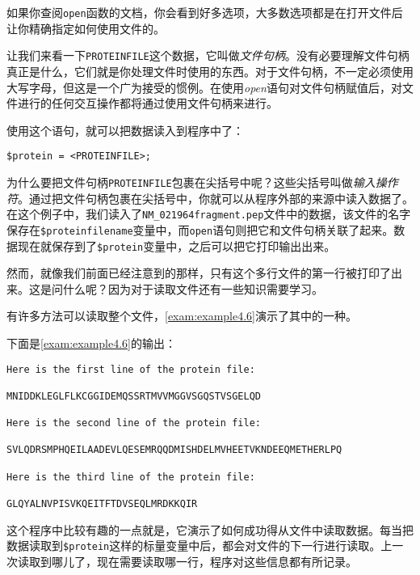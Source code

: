如果你查阅\verb|open|函数的文档，你会看到好多选项，大多数选项都是在打开文件后让你精确指定如何使用文件的。

让我们来看一下\verb|PROTEINFILE|这个数据，它叫做\textit{文件句柄}。没有必要理解文件句柄真正是什么，它们就是你处理文件时使用的东西。对于文件句柄，不一定必须使用大写字母，但这是一个广为接受的惯例。在使用\textit{open}语句对文件句柄赋值后，对文件进行的任何交互操作都将通过使用文件句柄来进行。

使用这个语句，就可以把数据读入到程序中了：

\begin{lstlisting}
$protein = <PROTEINFILE>;
\end{lstlisting}

为什么要把文件句柄\verb|PROTEINFILE|包裹在尖括号中呢？这些尖括号叫做\textit{输入操作符}。通过把文件句柄包裹在尖括号中，你就可以从程序外部的来源中读入数据了。在这个例子中，我们读入了\verb|NM_021964fragment.pep|文件中的数据，该文件的名字保存在\verb|$proteinfilename|变量中，而\verb|open|语句则把它和文件句柄关联了起来。数据现在就保存到了\verb|$protein|变量中，之后可以把它打印输出出来。

然而，就像我们前面已经注意到的那样，只有这个多行文件的第一行被打印了出来。这是问什么呢？因为对于读取文件还有一些知识需要学习。

有许多方法可以读取整个文件，\autoref{exam:example4.6}演示了其中的一种。



下面是\autoref{exam:example4.6}的输出：

\begin{lstlisting}
Here is the first line of the protein file:

MNIDDKLEGLFLKCGGIDEMQSSRTMVVMGGVSGQSTVSGELQD

Here is the second line of the protein file:

SVLQDRSMPHQEILAADEVLQESEMRQQDMISHDELMVHEETVKNDEEQMETHERLPQ

Here is the third line of the protein file:

GLQYALNVPISVKQEITFTDVSEQLMRDKKQIR
\end{lstlisting}

这个程序中比较有趣的一点就是，它演示了如何成功得从文件中读取数据。每当把数据读取到\verb|$protein|这样的标量变量中后，都会对文件的下一行进行读取。上一次读取到哪儿了，现在需要读取哪一行，程序对这些信息都有所记录。

